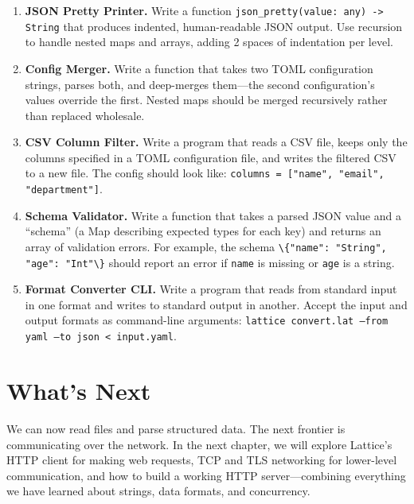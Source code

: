 \begin{enumerate}
    \item \textbf{JSON Pretty Printer.} Write a function
    \lstinline|json_pretty(value: any) -> String| that produces indented,
    human-readable JSON output. Use recursion to handle nested maps and
    arrays, adding 2 spaces of indentation per level.

    \item \textbf{Config Merger.} Write a function that takes two TOML
    configuration strings, parses both, and deep-merges them---the second
    configuration's values override the first. Nested maps should be merged
    recursively rather than replaced wholesale.

    \item \textbf{CSV Column Filter.} Write a program that reads a CSV file,
    keeps only the columns specified in a TOML configuration file, and writes
    the filtered CSV to a new file. The config should look like:
    \texttt{columns = ["name", "email", "department"]}.

    \item \textbf{Schema Validator.} Write a function that takes a parsed
    JSON value and a ``schema'' (a Map describing expected types for each key)
    and returns an array of validation errors. For example, the schema
    \lstinline|\{"name": "String", "age": "Int"\}| should report an error if
    \texttt{name} is missing or \texttt{age} is a string.

    \item \textbf{Format Converter CLI.} Write a program that reads from
    standard input in one format and writes to standard output in another.
    Accept the input and output formats as command-line arguments:
    \texttt{lattice convert.lat --from yaml --to json < input.yaml}.
\end{enumerate}

\section*{What's Next}\label{sec:data-formats-next}

We can now read files and parse structured data. The next frontier is
communicating over the network. In the next chapter, we will explore
Lattice's HTTP client for making web requests, TCP and TLS networking for
lower-level communication, and how to build a working HTTP server---combining
everything we have learned about strings, data formats, and concurrency.
